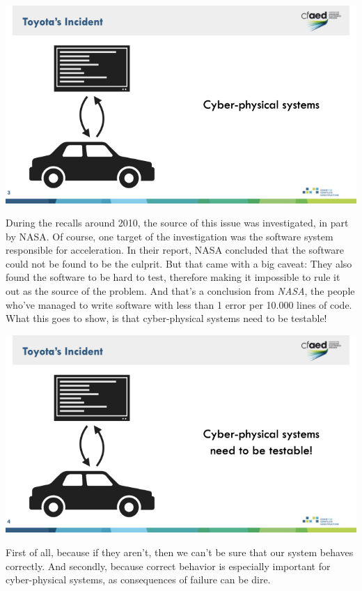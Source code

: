 \documentclass{article}
\begin{document}
\begin{center}
    \includegraphics[width=\columnwidth]{Slides/Slide 3.jpeg}
\end{center}

During the recalls around 2010, the source of this issue was investigated, in part by NASA.
Of course, one target of the investigation was the software system responsible for acceleration.
In their report, NASA concluded that the software could not be found to be the culprit.
But that came with a big caveat:
They also found the software to be hard to test, therefore making it impossible to rule it out as the source of the problem.
And that's a conclusion from \emph{NASA}, the people who've managed to write software with less than 1 error per 10.000 lines of code.
What this goes to show, is that cyber-physical systems need to be testable!

\begin{center}
    \includegraphics[width=\columnwidth]{Slides/Slide 4.jpeg}
\end{center}

First of all, because if they aren't, then we can't be sure that our system behaves correctly.
And secondly, because correct behavior is especially important for cyber-physical systems, as consequences of failure can be dire.
\end{document}
